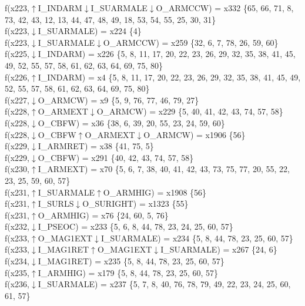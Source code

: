 f(x223,$\uparrow$I\_INDARM$\downarrow$I\_SUARMALE$\downarrow$O\_ARMCCW) = x332 \{65, 66, 71, 8, 73, 42, 43, 12, 13, 44, 47, 48, 49, 18, 53, 54, 55, 25, 30, 31\} \\  
f(x223,$\downarrow$I\_SUARMALE) = x224 \{4\} \\  
f(x223,$\downarrow$I\_SUARMALE$\downarrow$O\_ARMCCW) = x259 \{32, 6, 7, 78, 26, 59, 60\} \\  
f(x225,$\downarrow$I\_INDARM) = x226 \{5, 8, 11, 17, 20, 22, 23, 26, 29, 32, 35, 38, 41, 45, 49, 52, 55, 57, 58, 61, 62, 63, 64, 69, 75, 80\} \\  
f(x226,$\uparrow$I\_INDARM) = x4 \{5, 8, 11, 17, 20, 22, 23, 26, 29, 32, 35, 38, 41, 45, 49, 52, 55, 57, 58, 61, 62, 63, 64, 69, 75, 80\} \\  
f(x227,$\downarrow$O\_ARMCW) = x9 \{5, 9, 76, 77, 46, 79, 27\} \\  
f(x228,$\uparrow$O\_ARMEXT$\downarrow$O\_ARMCW) = x229 \{5, 40, 41, 42, 43, 74, 57, 58\} \\  
f(x228,$\downarrow$O\_CBFW) = x36 \{38, 6, 39, 20, 55, 23, 24, 59, 60\} \\  
f(x228,$\downarrow$O\_CBFW$\uparrow$O\_ARMEXT$\downarrow$O\_ARMCW) = x1906 \{56\} \\  
f(x229,$\downarrow$I\_ARMRET) = x38 \{41, 75, 5\} \\  
f(x229,$\downarrow$O\_CBFW) = x291 \{40, 42, 43, 74, 57, 58\} \\  
f(x230,$\uparrow$I\_ARMEXT) = x70 \{5, 6, 7, 38, 40, 41, 42, 43, 73, 75, 77, 20, 55, 22, 23, 25, 59, 60, 57\} \\  
f(x231,$\uparrow$I\_SUARMALE$\uparrow$O\_ARMHIG) = x1908 \{56\} \\  
f(x231,$\uparrow$I\_SURLS$\downarrow$O\_SURIGHT) = x1323 \{55\} \\  
f(x231,$\uparrow$O\_ARMHIG) = x76 \{24, 60, 5, 76\} \\  
f(x232,$\downarrow$I\_PSEOC) = x233 \{5, 6, 8, 44, 78, 23, 24, 25, 60, 57\} \\  
f(x233,$\uparrow$O\_MAG1EXT$\downarrow$I\_SUARMALE) = x234 \{5, 8, 44, 78, 23, 25, 60, 57\} \\  
f(x233,$\downarrow$I\_MAG1RET$\uparrow$O\_MAG1EXT$\downarrow$I\_SUARMALE) = x267 \{24, 6\} \\  
f(x234,$\downarrow$I\_MAG1RET) = x235 \{5, 8, 44, 78, 23, 25, 60, 57\} \\  
f(x235,$\uparrow$I\_ARMHIG) = x179 \{5, 8, 44, 78, 23, 25, 60, 57\} \\  
f(x236,$\downarrow$I\_SUARMALE) = x237 \{5, 7, 8, 40, 76, 78, 79, 49, 22, 23, 24, 25, 60, 61, 57\} \\  
